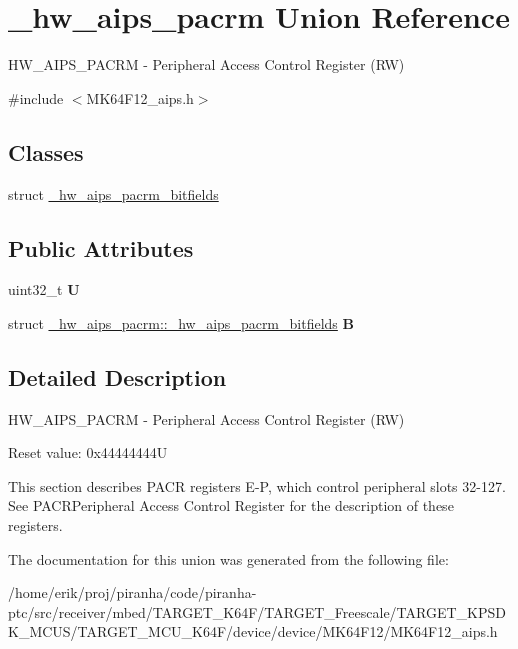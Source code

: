 \hypertarget{union__hw__aips__pacrm}{}\section{\+\_\+hw\+\_\+aips\+\_\+pacrm Union Reference}
\label{union__hw__aips__pacrm}


H\+W\+\_\+\+A\+I\+P\+S\+\_\+\+P\+A\+C\+RM -\/ Peripheral Access Control Register (RW)  




{\ttfamily \#include $<$M\+K64\+F12\+\_\+aips.\+h$>$}

\subsection*{Classes}
\begin{DoxyCompactItemize}
\item 
struct \hyperlink{struct__hw__aips__pacrm_1_1__hw__aips__pacrm__bitfields}{\+\_\+hw\+\_\+aips\+\_\+pacrm\+\_\+bitfields}
\end{DoxyCompactItemize}
\subsection*{Public Attributes}
\begin{DoxyCompactItemize}
\item 
uint32\+\_\+t {\bfseries U}\hypertarget{union__hw__aips__pacrm_a58d0606ebcb7e96533340e788a2772c6}{}\label{union__hw__aips__pacrm_a58d0606ebcb7e96533340e788a2772c6}

\item 
struct \hyperlink{struct__hw__aips__pacrm_1_1__hw__aips__pacrm__bitfields}{\+\_\+hw\+\_\+aips\+\_\+pacrm\+::\+\_\+hw\+\_\+aips\+\_\+pacrm\+\_\+bitfields} {\bfseries B}\hypertarget{union__hw__aips__pacrm_a543ea0475c317a1172cd6ae357904d77}{}\label{union__hw__aips__pacrm_a543ea0475c317a1172cd6ae357904d77}

\end{DoxyCompactItemize}


\subsection{Detailed Description}
H\+W\+\_\+\+A\+I\+P\+S\+\_\+\+P\+A\+C\+RM -\/ Peripheral Access Control Register (RW) 

Reset value\+: 0x44444444U

This section describes P\+A\+CR registers E-\/P, which control peripheral slots 32-\/127. See P\+A\+C\+R\+Peripheral Access Control Register for the description of these registers. 

The documentation for this union was generated from the following file\+:\begin{DoxyCompactItemize}
\item 
/home/erik/proj/piranha/code/piranha-\/ptc/src/receiver/mbed/\+T\+A\+R\+G\+E\+T\+\_\+\+K64\+F/\+T\+A\+R\+G\+E\+T\+\_\+\+Freescale/\+T\+A\+R\+G\+E\+T\+\_\+\+K\+P\+S\+D\+K\+\_\+\+M\+C\+U\+S/\+T\+A\+R\+G\+E\+T\+\_\+\+M\+C\+U\+\_\+\+K64\+F/device/device/\+M\+K64\+F12/M\+K64\+F12\+\_\+aips.\+h\end{DoxyCompactItemize}
